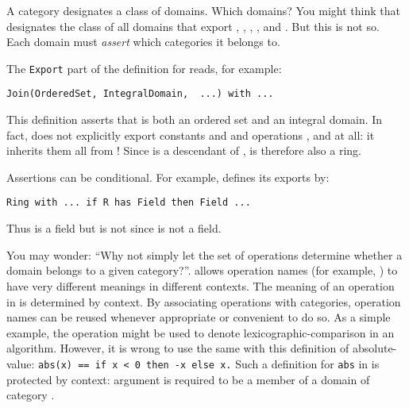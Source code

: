 \newpage


\par %
A category designates a class of domains.
Which domains?
You might think that  designates the class of all
domains that export
, ,
, , and
.
But this is not so.
Each domain must {\it assert} which categories it belongs to.

The {\tt Export} part of the definition for 
reads, for example:

\begin{verbatim}
Join(OrderedSet, IntegralDomain,  ...) with ...
\end{verbatim}
This definition asserts that  is
both an ordered set and an integral domain.
In fact,  does not explicitly export constants
 and  and operations ,
 and
 at all: it inherits them all from !
Since  is a descendant of ,
 is therefore also a ring.

Assertions can be conditional.
For example,  defines its exports by:

\begin{verbatim}
Ring with ... if R has Field then Field ...
\end{verbatim}
Thus  is a field but 
is not since  is not a field.

You may wonder:
``Why not simply let the set of operations determine
whether a domain belongs to a given category?''.
\Language{} allows operation names (for example,
) to have very different
meanings in different contexts.
The meaning of an operation in \Language{} is determined by context.
By associating operations with categories, operation names can be reused
whenever appropriate or convenient to do so.
As a simple example, the operation \spadop{<} might be used to denote
lexicographic-comparison in an algorithm.
However, it is wrong to use the same \spadop{<} with this
definition of absolute-value: {\tt abs(x) == if x < 0 then -x
else x.}
Such a definition for {\tt abs} in \Language{} is protected by context:
argument  is required to be a
member of a domain of category .

